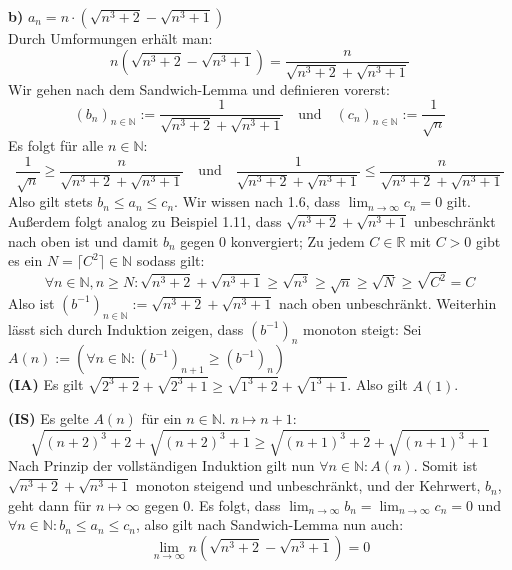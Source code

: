 \documentclass[a4paper,graphics,11pt]{article}
\begin{document}
\textbf{b)} $a_n = n\cdot \left(\sqrt{n^3+2} -\sqrt{n^3+1}\right)$\\[5pt]
Durch Umformungen erhält man:
$$
    n\left(\sqrt{n^3+2} - \sqrt{n^3+1}\right) = \frac{n}{\sqrt{n^3+2} + \sqrt{n^3+1}}
$$
Wir gehen nach dem Sandwich-Lemma und definieren vorerst:
$$
    (b_n)_{n \in \mathbb{N}} := \frac{1}{\sqrt{n^3+2}+\sqrt{n^3+1}}\quad \text{und}\quad
    (c_n)_{n \in \mathbb{N}} := \frac{1}{\sqrt{n}}
$$
Es folgt für alle $n\in \mathbb{N}\colon$ 
$$
    \frac{1}{\sqrt{n}} \geq \frac{n}{\sqrt{n^3+2}+\sqrt{n^3+1}}\quad\text{und}\quad
    \frac{1}{\sqrt{n^3+2} + \sqrt{n^3+1}} \leq \frac{n}{\sqrt{n^3+2} + \sqrt{n^3+1}}
$$
Also gilt stets $b_n \leq a_n \leq c_n$. Wir wissen nach 1.6, dass
$\lim_{n \to \infty}\limits c_n = 0$ gilt. Außerdem folgt analog zu Beispiel 1.11, dass
$\sqrt{n^3+2} + \sqrt{n^3+1} $ unbeschränkt nach oben ist und damit $b_n$ gegen 0
konvergiert; Zu jedem $C\in \mathbb{R}$ mit $C>0$ gibt es ein $N = \lceil C^2 \rceil \in \mathbb{N}$ sodass gilt:
$$
    \forall n \in \mathbb{N}, n\geq N \colon \sqrt{n^3+2} + \sqrt{n^3+1} \geq \sqrt{n^3} \geq \sqrt{n} \geq \sqrt{N}
    \geq \sqrt{C^2} = C
$$
Also ist $(b^{-1})_{n\in \mathbb{N}} := \sqrt{n^3+2} + \sqrt{n^3+1}$ nach oben unbeschränkt. Weiterhin lässt sich
durch Induktion zeigen, dass $(b^{-1})_n$ monoton steigt:
Sei $A(n) := \left(\forall n \in \mathbb{N}\colon (b^{-1})_{n+1} \geq (b^{-1})_n \right)$\\[5pt]
\textbf{(IA)} Es gilt $\sqrt{2^3+2} + \sqrt{2^3+1} \geq \sqrt{1^3+2} + \sqrt{1^3+1}$. Also
gilt $A(1)$.

\textbf{(IS)} Es gelte $A(n)$ für ein $n\in \mathbb{N}$. $n\mapsto n+1\colon$
$$
\sqrt{(n+2)^3+2} + \sqrt{(n+2)^3+1} \geq \sqrt{(n+1)^3+2} + \sqrt{(n+1)^3+1}
$$
Nach Prinzip der vollständigen Induktion gilt nun $\forall n \in \mathbb{N}\colon A(n)$.
Somit ist $\sqrt{n^3+2} + \sqrt{n^3+1}$ monoton steigend und unbeschränkt, und der Kehrwert,
$b_n$, geht dann für $n\mapsto \infty$ gegen 0.
Es folgt, dass $\lim_{n \to \infty}\limits b_n = \lim_{n \to \infty}\limits c_n = 0$ und
$\forall n \in \mathbb{N}\colon b_n \leq a_n \leq c_n$, also gilt nach Sandwich-Lemma nun
auch:
$$
    \lim_{n \to \infty} n\left(\sqrt{n^3+2} -\sqrt{n^3+1}\right) = 0
$$
\end{document}
